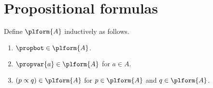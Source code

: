 
\section{Propositional formulas}

\begin{datatype}\label{pl_formula}
    Define $\plform{A}$ inductively as follows.
    \begin{enumerate}
        \item[Falsity] $\propbot\in\plform{A}$.
        \item[Atom] $\propvar{a}\in\plform{A}$ for $a\in A$.
        \item[Implication]
            $(p\propto q)\in\plform{A}$ for
            $p\in\plform{A}$ and $q\in\plform{A}$.
    \end{enumerate}
\end{datatype}

